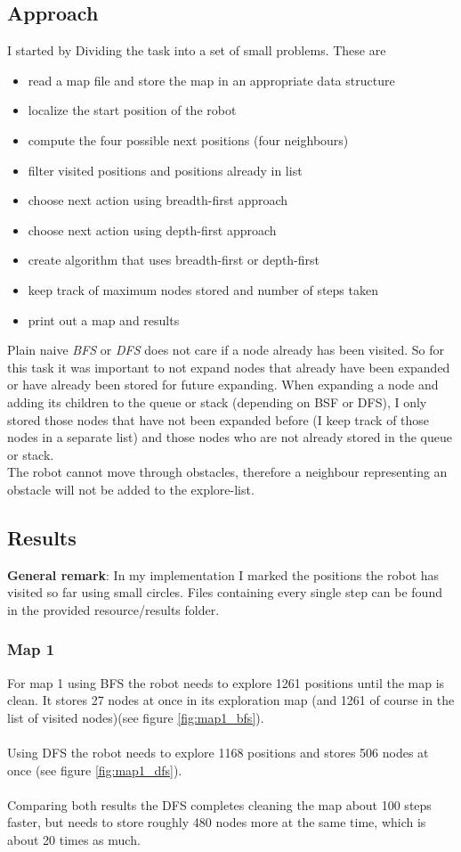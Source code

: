 \documentclass[paper=a4, fontsize=11pt]{scrartcl} %
\numberwithin{equation}{section} %
\numberwithin{figure}{section} %
\numberwithin{table}{section} %
\begin{document}
\subsection{Approach}
I started by Dividing the task into a set of small problems. These are
\begin{itemize}
\item read a map file and store the map in an appropriate data structure
\item localize the start position of the robot
\item compute the four possible next positions (four neighbours)
\item filter visited positions and positions already in list
\item choose next action using breadth-first approach
\item choose next action using depth-first approach
\item create algorithm that uses breadth-first or depth-first
\item keep track of maximum nodes stored and number of steps taken
\item print out a map and results
\end{itemize}
Plain naive \emph{BFS} or \emph{DFS} does not care if a node already has been visited. So for this task it was important to not expand nodes that already have been expanded or have already  been stored for future expanding. When expanding a node and adding its children to the queue or stack (depending on BSF or DFS), I only stored those nodes that have not been expanded before (I keep track of those nodes in a separate list) and those nodes who are not already stored in the queue or stack.\\
The robot cannot move through obstacles, therefore a neighbour representing an obstacle will not be added to the explore-list.

\subsection{Results}
\textbf{General remark}: In my implementation I marked the positions the robot has visited so far using small circles. Files containing every single step can be found in the provided resource/results folder.

\subsubsection{Map 1}
For map 1 using BFS the robot needs to explore 1261 positions until the map is clean. It stores 27 nodes at once in its exploration map (and 1261 of course in the list of visited nodes)(see figure \ref{fig:map1_bfs}).\\\\
Using DFS the robot needs to explore 1168 positions and stores 506 nodes at once (see figure \ref{fig:map1_dfs}).\\\\
Comparing both results the DFS completes cleaning the map about 100 steps faster, but needs to store roughly 480 nodes more at the same time, which is about 20 times as much.\\
\end{document}
